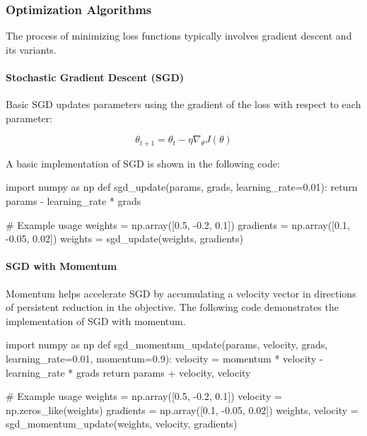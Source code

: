 \subsubsection{Optimization Algorithms}
The process of minimizing loss functions typically involves gradient descent and its variants.

\paragraph{Stochastic Gradient Descent (SGD)}
Basic SGD updates parameters using the gradient of the loss with respect to each parameter:

\[ \theta_{t+1} = \theta_t - \eta \nabla_\theta J(\theta) \]

A basic implementation of SGD is shown in the following code:

\begin{pythoncode}
import numpy as np
def sgd_update(params, grads, learning_rate=0.01):
    return params - learning_rate * grads

# Example usage
weights = np.array([0.5, -0.2, 0.1])
gradients = np.array([0.1, -0.05, 0.02])
weights = sgd_update(weights, gradients)
\end{pythoncode}

\paragraph{SGD with Momentum}
Momentum helps accelerate SGD by accumulating a velocity vector in directions of persistent reduction in the objective. The following code demonstrates the implementation of SGD with momentum.

\begin{pythoncode}
import numpy as np
def sgd_momentum_update(params, velocity, grads, 
                        learning_rate=0.01, momentum=0.9):
    velocity = momentum * velocity - learning_rate * grads
    return params + velocity, velocity

# Example usage
weights = np.array([0.5, -0.2, 0.1])
velocity = np.zeros_like(weights)
gradients = np.array([0.1, -0.05, 0.02])
weights, velocity = sgd_momentum_update(weights, velocity, gradients)
\end{pythoncode}

